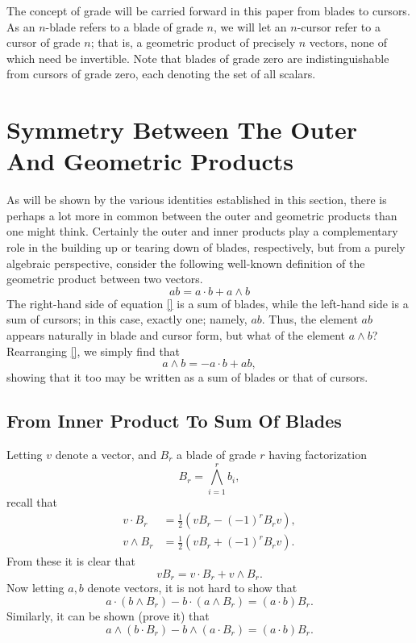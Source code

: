 \documentclass{birkjour}
\theoremstyle{definition}
\theoremstyle{remark}
\numberwithin{equation}{section}
\begin{document}
The concept of grade will be carried forward in this paper from blades to cursors.  As an $n$-blade
refers to a blade of grade $n$, we will let an $n$-cursor refer to a cursor of grade $n$; that is, a geometric
product of precisely $n$ vectors, none of which need be invertible.  Note that blades of grade zero
are indistinguishable from cursors of grade zero, each denoting the set of all scalars.

\section{Symmetry Between The Outer And Geometric Products}

As will be shown by the various identities established in this section, there is perhaps a lot more in
common between the outer and geometric products than one might think.  Certainly the outer and
inner products play a complementary role in the building up or tearing down of blades, respectively, but from a
purely algebraic perspective, consider the following well-known definition of the geometric product
between two vectors.
\begin{equation}
ab = a\cdot b + a\wedge b
\end{equation}
The right-hand side of equation \eqref{} is a sum of blades, while the left-hand side is a sum of cursors;
in this case, exactly one; namely, $ab$.  Thus, the element $ab$ appears naturally in blade and cursor form,
but what of the element $a\wedge b$?  Rearranging \eqref{}, we simply find that
\begin{equation}
a\wedge b = -a\cdot b + ab,
\end{equation}
showing that it too may be written as a sum of blades or that of cursors.

\subsection{From Inner Product To Sum Of Blades}

Letting $v$ denote a vector, and $B_r$ a blade of grade $r$ having factorization
\begin{equation}
B_r = \bigwedge_{i=1}^r b_i,
\end{equation}
recall that
\begin{align}
v\cdot B_r &= \frac{1}{2}(vB_r-(-1)^rB_rv), \\
v\wedge B_r &= \frac{1}{2}(vB_r+(-1)^rB_rv).
\end{align}
From these it is clear that
\begin{equation}
vB_r = v\cdot B_r + v\wedge B_r.
\end{equation}
Now letting $a,b$ denote vectors, it is not hard to show that
\begin{equation}
a\cdot(b\wedge B_r) - b\cdot(a\wedge B_r) = (a\cdot b)B_r.
\end{equation}
Similarly, it can be shown (prove it) that
\begin{equation}
a\wedge(b\cdot B_r) - b\wedge(a\cdot B_r) = (a\cdot b)B_r.
\end{equation}
\end{document}
